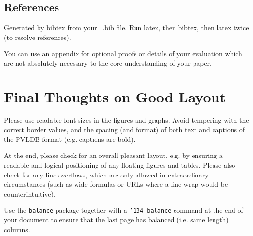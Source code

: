 \documentclass{vldb}
\begin{document}
\subsection{References}
Generated by bibtex from your ~.bib file.  Run latex,
then bibtex, then latex twice (to resolve references).


\begin{appendix}
You can use an appendix for optional proofs or details of your evaluation which are not absolutely necessary to the core understanding of your paper. 

\section{Final Thoughts on Good Layout}
Please use readable font sizes in the figures and graphs. Avoid tempering with the correct border values, and the spacing (and format) of both text and captions of the PVLDB format (e.g. captions are bold).

At the end, please check for an overall pleasant layout, e.g. by ensuring a readable and logical positioning of any floating figures and tables. Please also check for any line overflows, which are only allowed in extraordinary circumstances (such as wide formulas or URLs where a line wrap would be counterintuitive).

Use the \texttt{balance} package together with a \texttt{\char'134 balance} command at the end of your document to ensure that the last page has balanced (i.e. same length) columns.

\end{appendix}
\end{document}
